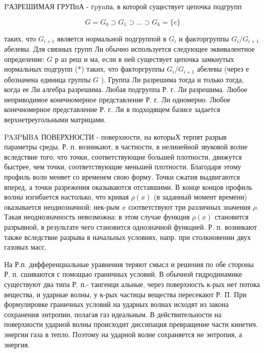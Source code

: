 \documentclass[10pt]{article}
\begin{document}
PАЗРЕШИМАЯ ГРУПпА - гpуnпа, в которой существует цепочка подгрупп



\[

G=G_{0} \supset G_{1} \supset \ldots \supset G_{k}=\{e\}

\]



таких, что $G_{i+1}$ является нормальной подгруппой в $G_{i}$ и факторгруппы $G_{i} / G_{i+1}$ абелевы. Для связных групп Ли обычно используется следующее эквивалентное определение: $G$ р аз реш и ма, если в ней существует цепочка замкнутых нормальных подгрупп (*) таких, что факторгруппы $G_{i} / G_{i+1}$ абелевы (через $е$ обозначена единица группы $G$ ). Группа Ли разрешима тогда и только тогда, когда ее Ли алгебра разрешима. Любая подгруппа Р. г. Ли разрешима. Любое неприводимое конечномерное представление Р. г. Ли одномерно. Любое конечномерное представление Р. г. Ли в подходящем базисе задается верхнетреугольными матрицами.



PA3PЫBA ПОВЕРХНОСТИ - поверхности, на которыХ терпят разрыв параметры среды. Р. п. возникают, в частности, в нелинейной звуковой волне вследствие того, что точки, соответствующие большей плотности, движутся быстрее, чем точки, соответствующие меньшей плотности. Благодаря этому профиль волн меняет со временем свою форму. Точки сжатия выдвигаются вперед, а точки разрежения оказываются отставшими. В конце концов профиль волны изгибается настолько, что кривая $\rho(x)$ (в заданный момент времени) оказывается неоднозначной: нек-рым $x$ соответствуют три различных значения $\rho$. Такая неоднозначность невозможна: в этом случае функция $\rho(x)$ становится разрывной, в результате чего становится однозначной функцией. Р. п. возникают также вследствие разрыва в начальных условиях, напр. при столкновении двух газовых масс.



На Р.п. дифференциальные уравнения теряют смысл и решения по обе стороны Р. п. сшиваются с помощью граничных условий. В обычной гидродинамике существуют два типа Р. п.- тангенци альные, через поверхность к-рых нет потока вещества, и ударные волны, у к-рых частицы вещества пересекают Р. П. При формулировке граничных условий на ударных волнах исходят из закона сохранения энтропии, полагая газ идеальным. В действительности на поверхности ударной волны происходит диссипация превращение части кинетич. энергии газа в тепло. Поэтому на ударной волне сохраняется не энтропия, а энергия.
\end{document}
